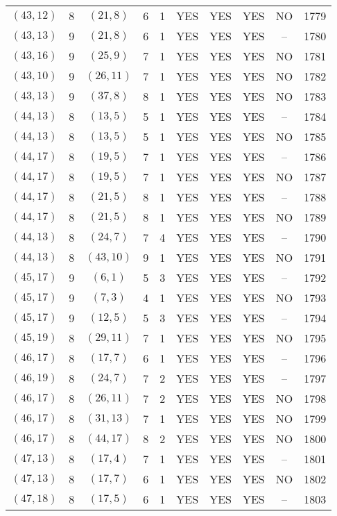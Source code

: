 \begin{longtable}{|c|c|c|c|c|c|c|c|c|c|}
$(43, 12)$ & 8 & $(21, 8)$ & 6 & 1 & YES & YES & YES & NO & 1779\\
$(43, 13)$ & 9 & $(21, 8)$ & 6 & 1 & YES & YES & YES & -- & 1780\\
$(43, 16)$ & 9 & $(25, 9)$ & 7 & 1 & YES & YES & YES & NO & 1781\\
$(43, 10)$ & 9 & $(26, 11)$ & 7 & 1 & YES & YES & YES & NO & 1782\\
$(43, 13)$ & 9 & $(37, 8)$ & 8 & 1 & YES & YES & YES & NO & 1783\\
$(44, 13)$ & 8 & $(13, 5)$ & 5 & 1 & YES & YES & YES & -- & 1784\\
$(44, 13)$ & 8 & $(13, 5)$ & 5 & 1 & YES & YES & YES & NO & 1785\\
$(44, 17)$ & 8 & $(19, 5)$ & 7 & 1 & YES & YES & YES & -- & 1786\\
$(44, 17)$ & 8 & $(19, 5)$ & 7 & 1 & YES & YES & YES & NO & 1787\\
$(44, 17)$ & 8 & $(21, 5)$ & 8 & 1 & YES & YES & YES & -- & 1788\\
$(44, 17)$ & 8 & $(21, 5)$ & 8 & 1 & YES & YES & YES & NO & 1789\\
$(44, 13)$ & 8 & $(24, 7)$ & 7 & 4 & YES & YES & YES & -- & 1790\\
$(44, 13)$ & 8 & $(43, 10)$ & 9 & 1 & YES & YES & YES & NO & 1791\\
$(45, 17)$ & 9 & $(6, 1)$ & 5 & 3 & YES & YES & YES & -- & 1792\\
$(45, 17)$ & 9 & $(7, 3)$ & 4 & 1 & YES & YES & YES & NO & 1793\\
$(45, 17)$ & 9 & $(12, 5)$ & 5 & 3 & YES & YES & YES & -- & 1794\\
$(45, 19)$ & 8 & $(29, 11)$ & 7 & 1 & YES & YES & YES & NO & 1795\\
$(46, 17)$ & 8 & $(17, 7)$ & 6 & 1 & YES & YES & YES & -- & 1796\\
$(46, 19)$ & 8 & $(24, 7)$ & 7 & 2 & YES & YES & YES & -- & 1797\\
$(46, 17)$ & 8 & $(26, 11)$ & 7 & 2 & YES & YES & YES & NO & 1798\\
$(46, 17)$ & 8 & $(31, 13)$ & 7 & 1 & YES & YES & YES & NO & 1799\\
$(46, 17)$ & 8 & $(44, 17)$ & 8 & 2 & YES & YES & YES & NO & 1800\\
$(47, 13)$ & 8 & $(17, 4)$ & 7 & 1 & YES & YES & YES & -- & 1801\\
$(47, 13)$ & 8 & $(17, 7)$ & 6 & 1 & YES & YES & YES & NO & 1802\\
$(47, 18)$ & 8 & $(17, 5)$ & 6 & 1 & YES & YES & YES & -- & 1803\\

\end{longtable}
